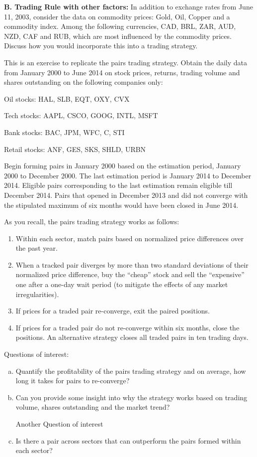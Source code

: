 \textbf{B. Trading Rule with other factors:} In addition to exchange rates from June 11, 2003, consider the data on commodity prices: Gold, Oil, Copper and a commodity index. Among the following currencies, CAD, BRL, ZAR, AUD, NZD, CAF and RUB, which are most influenced by the commodity prices. Discuss how you would incorporate this into a trading strategy. \twomedskip


\prob This is an exercise to replicate the pairs trading strategy. Obtain the daily data from January 2000 to June 2014 on stock prices, returns, trading volume and shares outstanding on the following companies only: \twomedskip

\indent Oil stocks: HAL, SLB, EQT, OXY, CVX \twomedskip

\indent Tech stocks: AAPL, CSCO, GOOG, INTL, MSFT \twomedskip

\indent Bank stocks: BAC, JPM, WFC, C, STI \twomedskip

\indent Retail stocks: ANF, GES, SKS, SHLD, URBN \twomedskip

Begin forming pairs in January 2000 based on the estimation period, January 2000 to December 2000. The last estimation period is January 2014 to December 2014. Eligible pairs corresponding to the last estimation remain eligible till December 2014. Pairs that opened in December 2013 and did not converge with the stipulated maximum of six months would have been closed in June 2014.


As you recall, the pairs trading strategy works as follows:
	\begin{enumerate}[--]
	\item Within each sector, match pairs based on normalized price differences over the past year.
	\item When a tracked pair diverges by more than two standard deviations of their normalized price difference, buy the ``cheap'' stock and sell the ``expensive'' one after a one-day wait period (to mitigate the effects of any market irregularities).
	\item If prices for a traded pair re-converge, exit the paired positions.
	\item If prices for a traded pair do not re-converge within six months, close the positions. An alternative strategy closes all traded pairs in ten trading days.
	\end{enumerate}

\noindent Questions of interest:
	\begin{enumerate}[(a)]
	\item Quantify the profitability of the pairs trading strategy and on average, how long it takes for pairs to re-converge?
	\item Can you provide some insight into why the strategy works based on trading volume, shares outstanding and the market trend?


Another Question of interest
	\item Is there a pair across sectors that can outperform the pairs formed within each sector? \twomedskip
	\end{enumerate}


